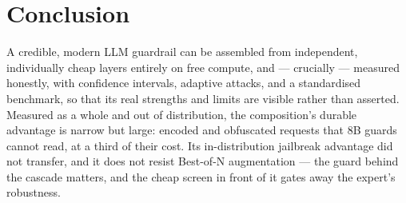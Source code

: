\documentclass[11pt]{article}
\begin{document}
\section{Conclusion}
A credible, modern LLM guardrail can be assembled from independent, individually cheap layers entirely
on free compute, and --- crucially --- measured honestly, with confidence intervals, adaptive attacks,
and a standardised benchmark, so that its real strengths and limits are visible rather than asserted.
Measured as a whole and out of distribution, the composition's durable advantage is narrow but large:
encoded and obfuscated requests that 8B guards cannot read, at a third of their cost. Its in-distribution
jailbreak advantage did not transfer, and it does not resist Best-of-N augmentation --- the guard behind
the cascade matters, and the cheap screen in front of it gates away the expert's robustness.
\end{document}
